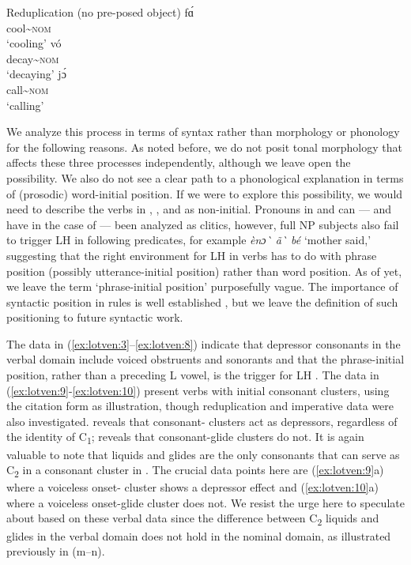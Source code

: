 \documentclass[output=paper
,newtxmath
,modfonts
,nonflat]{langsci/langscibook}
\begin{document}
\ea\label{ex:lotven:8}Reduplication (no pre-posed object)
\ea\label{ex:lotven:8a}    
    fɑ́\\
    cool{\textasciitilde}\textsc{nom}    \\
    \glt ‘cooling’
\ex\label{ex:lotven:8b}
	vó\\
    decay{\textasciitilde}\textsc{nom}\\
    \glt ‘decaying’
\ex\label{ex:lotven:8c}
	jɔ́\\
    call{\textasciitilde}\textsc{nom} \\
    \glt ‘calling’
\z
\z


We analyze this process in terms of syntax rather than morphology or phonology for the following reasons. As noted before, we do not posit tonal morphology that affects these three processes independently, although we leave open the possibility. We also do not see a clear path to a phonological explanation in terms of (prosodic) word-initial position. If we were to explore this possibility, we would need to describe the verbs in , , and  as non-initial. Pronouns in  and  can — and have in the case of  \citep{Duthie1996} — been analyzed as clitics, however, full NP subjects also fail to trigger LH  in following predicates, for example \textit{ènɔ\`{} ã\`{}  bé} ‘mother said,’ suggesting that the right environment for LH  in verbs has to do with phrase position (possibly utterance-initial position) rather than word position. As of yet, we leave the term ‘phrase-initial position’ purposefully vague. The importance of syntactic position in  rules is well established \citep{Snider2014}, but we leave the definition of such positioning to future syntactic work.

The data in (\ref{ex:lotven:3}–\ref{ex:lotven:8}) indicate that depressor consonants in the verbal domain include voiced obstruents and sonorants and that the phrase-initial position, rather than a preceding L  vowel, is the trigger for LH . The data in (\ref{ex:lotven:9}-\ref{ex:lotven:10}) present verbs with initial consonant clusters, using the citation form as illustration, though reduplication and imperative data were also investigated.  reveals that consonant- clusters act as depressors, regardless of the identity of C\textsubscript{1};  reveals that consonant-glide clusters do not. It is again valuable to note that liquids and glides are the only consonants that can serve as C\textsubscript{2} in a consonant cluster in . The crucial data points here are (\ref{ex:lotven:9}a) where a voiceless onset- cluster shows a depressor effect and (\ref{ex:lotven:10}a) where a voiceless onset-glide cluster does not. We resist the urge here to speculate about  based on these verbal data since the difference between C\textsubscript{2} liquids and glides in the verbal domain does not hold in the nominal domain, as illustrated previously in  (m–n).
\end{document}
